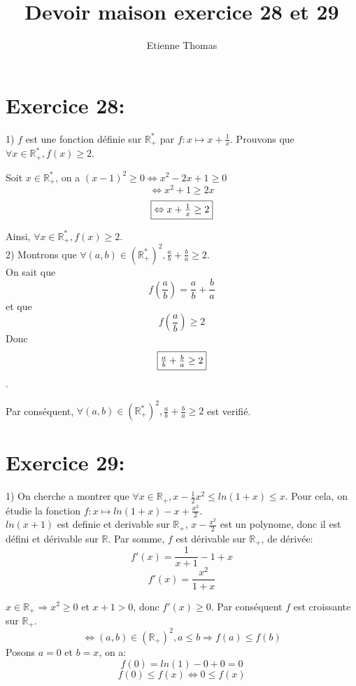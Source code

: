 \documentclass[11pt, letterpaper]{article}
\title{Devoir maison exercice 28 et 29}
\author{Etienne Thomas}
\begin{document}
\maketitle

\section*{Exercice 28:}

1) $f$ est une fonction définie sur $\mathbb{R}_{+}^{*}$ par $f : x \mapsto x + \frac{1}{x}$.
Prouvons que $\forall x \in \mathbb{R}_{+}^{*}, f(x) \geq 2$.

Soit $x \in \mathbb{R}_{+}^{*}$, on a $(x - 1)^2 \geq 0 \Leftrightarrow x^2 - 2x + 1 \geq 0$
\[\Leftrightarrow x^2 + 1 \geq 2x\]
\[\fbox{$\Leftrightarrow x + \frac{1}{x} \geq 2$}\]

Ainsi, $\forall x \in \mathbb{R}_{+}^{*}, f(x) \geq 2$.
\\
2) Montrons que $\forall (a, b) \in (\mathbb{R}_{+}^{*})^2, \frac{a}{b} + \frac{b}{a} \geq 2$.\\
On sait que 
\[ f(\frac{a}{b}) = \frac{a}{b} + \frac{b}{a} \]
et que \[f(\frac{a}{b}) \geq 2\]
Donc \[\fbox{$\frac{a}{b} + \frac{b}{a} \geq 2$}\].

Par conséquent, $\forall (a, b) \in (\mathbb{R}_{+}^{*})^2, \frac{a}{b} + \frac{b}{a} \geq 2$ est verifié.

\section*{Exercice 29:}

1) On cherche a montrer que $\forall x \in \mathbb{R}_{+}, x - \frac{1}{2}x^2 \leq ln(1 + x) \leq x$.
Pour cela, on étudie la fonction $f : x \mapsto ln(1 + x) - x + \frac{x^2}{2}$.\\
$ln(x + 1)$ est definie et derivable sur $\mathbb{R}_{+}$, $x - \frac{x^2}{2}$ est un polynome,
donc il est défini et dérivable sur $\mathbb{R}$.
Par somme, $f$ est dérivable sur $\mathbb{R}_{+}$, de dérivée:
\[f'(x) = \frac{1}{x + 1} - 1 + x\]
\[f'(x) = \frac{x^2}{1 + x}\]

$x \in \mathbb{R}_{+} \Rightarrow x^2 \geq 0$ et $ x + 1 > 0$, donc $f'(x) \geq 0$.
Par conséquent $f$ est croissante sur $\mathbb{R}_{+}$.\\
\[\Leftrightarrow (a, b) \in (\mathbb{R}_{+})^2, a \leq b \Rightarrow f(a) \leq f(b)\]
Posons $a = 0$ et $b = x$, on a: \[f(0) = ln(1) - 0 + 0 = 0\]
\[f(0) \leq f(x) \Leftrightarrow 0 \leq f(x)  \]
\end{document}
